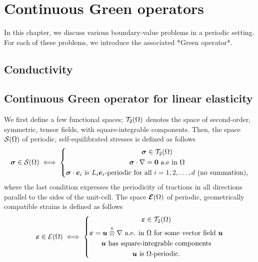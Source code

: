 \chapter{Continuous Green operators}

In this chapter, we discuss various boundary-value problems in a periodic
setting. For each of these problems, we introduce the associated *Green
operator*.

\section{Conductivity}

\section{Continuous Green operator for linear elasticity}

We first define a few functional spaces; \(\mathcal T_2(\Omega)\) denotes the
space of second-order, symmetric, tensor fields, with square-integrable
components. Then, the space \(\mathcal S(\Omega)\) of periodic, self-equilibrated
stresses is defined as follows
\begin{equation}
  \boldsymbol\sigma\in\mathcal S(\Omega)\iff\left\{
    \begin{gathered}
      \boldsymbol\sigma\in\mathcal T_2(\Omega)\\
      \boldsymbol\sigma\cdot\nabla=\boldsymbol 0\text{ a.e in }\Omega\\
      \boldsymbol\sigma\cdot\boldsymbol e_i\text{ is }L_i\boldsymbol e_i
      \text{-periodic for all }i=1, 2, \ldots, d\text{ (no summation),}
    \end{gathered}
  \right.
\end{equation}
where the last condition expresses the periodicity of tractions in all
directions parallel to the sides of the unit-cell. The space
\(\boldsymbol{\mathcal E}(\Omega)\) of periodic, geometrically compatible strains is
defined as follows
\begin{equation}
  \boldsymbol\varepsilon\in\mathcal E(\Omega)\iff\left\{
    \begin{gathered}
      \boldsymbol\varepsilon\in\mathcal T_2(\Omega)\\
      \boldsymbol\varepsilon=\boldsymbol u\stackrel{\mathrm{s}}{\otimes}\nabla
      \text{ a.e. in }\Omega\text{ for some vector field }\boldsymbol u\\
      \boldsymbol u\text{ has square-integrable components}\\
      \boldsymbol u\text{ is }\Omega\text{-periodic.}
    \end{gathered}
  \right.
\end{equation}

